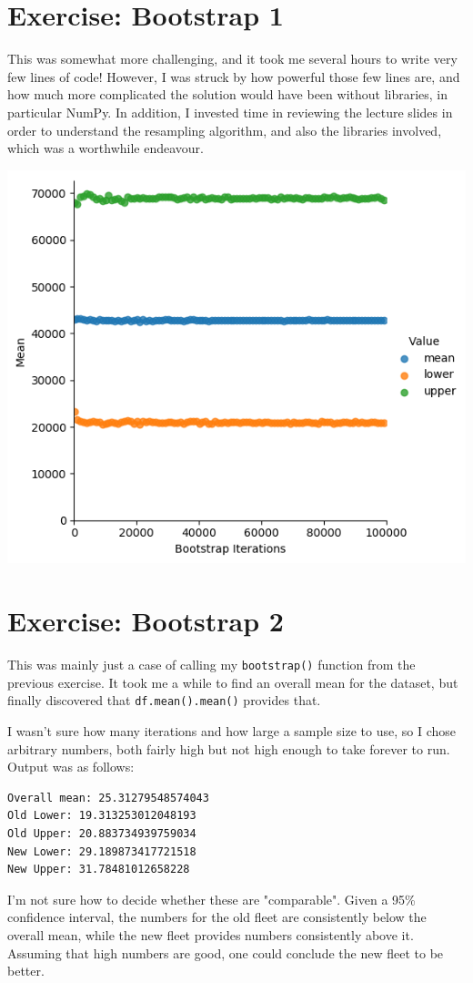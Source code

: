 \documentclass[a4paper]{article}
\begin{document}
\section{Exercise: Bootstrap 1}

This was somewhat more challenging, and it took me several hours to write very few lines of code! However, I was struck by how powerful those few lines are, and how much more complicated the solution would have been without libraries, in particular NumPy. In addition, I invested time in reviewing the lecture slides in order to understand the resampling algorithm, and also the libraries involved, which was a worthwhile endeavour.

\begin{center}
   \includegraphics[scale=0.6]{bootstrap_confidence.png}
\end{center}

\section{Exercise: Bootstrap 2}

This was mainly just a case of calling my \texttt{bootstrap()} function from the previous exercise. It took me a while to find an overall mean for the dataset, but finally discovered that \texttt{df.mean().mean()} provides that.

I wasn't sure how many iterations and how large a sample size to use, so I chose arbitrary numbers, both fairly high but not high enough to take forever to run. Output was as follows:

\begin{verbatim}
Overall mean: 25.31279548574043
Old Lower: 19.313253012048193
Old Upper: 20.883734939759034
New Lower: 29.189873417721518
New Upper: 31.78481012658228
\end{verbatim}

I'm not sure how to decide whether these are "comparable". Given a 95\% confidence interval, the numbers for the old fleet are consistently below the overall mean, while the new fleet provides numbers consistently above it. Assuming that high numbers are good, one could conclude the new fleet to be better.
\end{document}
